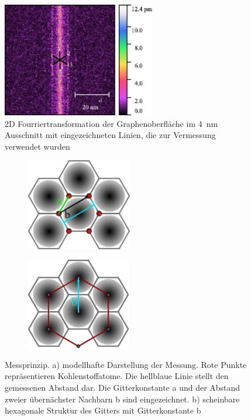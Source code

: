 \documentclass[a4paper,twoside,final]{article}
\begin{document}
\begin{figure}[htp]
  \centering
    \includegraphics[height = 5cm]{Bilder/Image02001_2DFFT.pdf}
    \caption{2D Fourriertransformation der Graphenoberfläche im \SI{4}{\nano\meter} Ausschnitt mit eingezeichneten Linien, die zur Vermessung verwendet wurden}
    \label{fig:2DFFT_Graphen}
\end{figure}



\begin{figure}[htp]
    \centering
    \begin{subfigure}{0.45\textwidth}
        \includegraphics[height=4cm]{Bilder/Graphen_in_Messung.pdf}
        \caption{ }
        \label{fig:MessungModella}
    \end{subfigure}
    \hspace{0.5cm}
    \begin{subfigure}{0.45\textwidth}
        \includegraphics[height=4cm]{Bilder/HexagonalesGitter.pdf}
        \caption{ }
        \label{fig:MessungModellb}
    \end{subfigure}
    \caption{Messprinzip. a) modellhafte Darstellung der Messung. Rote Punkte repräsentieren Kohlenstoffatome. Die hellblaue Linie stellt den gemessenen Abstand dar. Die Gitterkonstante a und der Abstand zweier übernächster Nachbarn b sind eingezeichnet. b) scheinbare hexagonale Struktur des Gitters mit Gitterkonstante b}

\end{figure}
\end{document}
